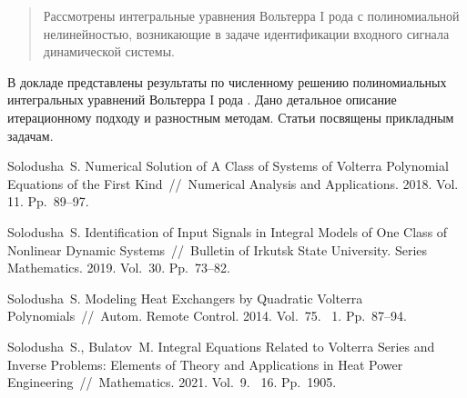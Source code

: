\maketitle

\begin{abstract}
Рассмотрены интегральные уравнения Вольтерра I рода с полиномиальной нелинейностью, возникающие в задаче идентификации входного сигнала динамической системы.

\end{abstract}


В докладе представлены результаты по численному решению полиномиальных интегральных уравнений Вольтерра I рода \cite{solodusha1, solodusha2}. Дано детальное описание итерационному подходу и разностным методам. Статьи \cite{solodusha3, solodusha4}  посвящены прикладным задачам.




%

\begin{thebibliography}{9} %
  Solodusha~S. Numerical Solution of A Class of Systems of Volterra Polynomial Equations of the First Kind~//~Numerical Analysis and Applications. 2018. Vol. 11. Pp.~89--97. 

  Solodusha~S. Identification of Input Signals in Integral Models of One Class of Nonlinear  Dynamic Systems~//~Bulletin of Irkutsk State University. Series Mathematics. 2019. Vol.~30. Pp.~73--82.

 Solodusha~S. Modeling Heat Exchangers by Quadratic Volterra Polynomials~//~Autom. Remote Control. 2014. Vol.~75.  \textnumero~1. Pp.~87--94.  

 Solodusha~S., Bulatov~M. Integral Equations Related to Volterra Series and Inverse Problems:
Elements of Theory and Applications in Heat Power Engineering~//~Mathematics. 2021. Vol.~9.  \textnumero~16. Pp.~1905. 

\end{thebibliography}





%
